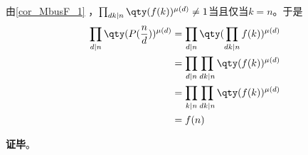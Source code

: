 由\autoref{cor_MbusF_1} ，$\prod_{dk\mid n}\qty(f(k))^{\mu(d)}\neq 1$当且仅当$k=n$。于是
\begin{equation}
\begin{aligned}
\prod_{d\mid n}\qty(P(\frac{n}{d}))^{\mu(d)}&=\prod_{d\mid n}\qty(\prod_{dk\mid n}f(k))^{\mu(d)}\\
&=\prod_{d\mid n}\prod_{dk\mid n}\qty(f(k))^{\mu(d)}\\
&=\prod_{k\mid n}\prod_{dk\mid n}\qty(f(k))^{\mu(d)}\\
&=f(n)
\end{aligned}
\end{equation}

\textbf{证毕}。

















